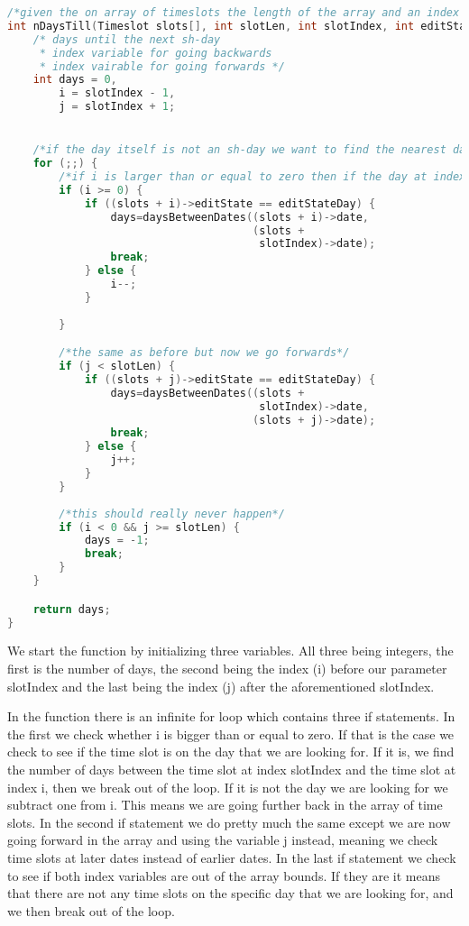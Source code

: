 \begin{lstlisting}[caption={nDaysTill function.}, label={lst:nDaysTill}, language=c]
/*given the on array of timeslots the length of the array and an index return the number of days to a sh-day*/
int nDaysTill(Timeslot slots[], int slotLen, int slotIndex, int editStateDay) {
    /* days until the next sh-day
     * index variable for going backwards 
     * index vairable for going forwards */
    int days = 0, 
        i = slotIndex - 1,
        j = slotIndex + 1;


    /*if the day itself is not an sh-day we want to find the nearest day which is*/
    for (;;) {
        /*if i is larger than or equal to zero then if the day at index i as sh-day set day equals i and break, otherwise go to the previous day*/
        if (i >= 0) {
            if ((slots + i)->editState == editStateDay) {
                days=daysBetweenDates((slots + i)->date,
                                      (slots +
                                       slotIndex)->date);
                break;
            } else {
                i--;
            }
            
        }

        /*the same as before but now we go forwards*/
        if (j < slotLen) {
            if ((slots + j)->editState == editStateDay) {
                days=daysBetweenDates((slots +  
                                       slotIndex)->date,
                                      (slots + j)->date);
                break;
            } else {
                j++;
            }
        }
        
        /*this should really never happen*/
        if (i < 0 && j >= slotLen) {
            days = -1;
            break; 
        } 
    } 

    return days;
}
\end{lstlisting}

We start the function by initializing three variables. All three being integers, the first is the number of days, the second being the index (i) before our parameter slotIndex and the last being the index (j) after the aforementioned slotIndex. 

In the function there is an infinite for loop which contains three if statements. In the first we check whether i is bigger than or equal to zero. If that is the case we check to see if the time slot is on the day that we are looking for. If it is, we find the number of days between the time slot at index slotIndex and the time slot at index i, then we break out of the loop. If it is not the day we are looking for we subtract one from i. This means we are going further back in the array of time slots. In the second if statement we do pretty much the same except we are now going forward in the array and using the variable j instead, meaning we check time slots at later dates instead of earlier dates. In the last if statement we check to see if both index variables are out of the array bounds. If they are it means that there are not any time slots on the specific day that we are looking for, and we then break out of the loop.

